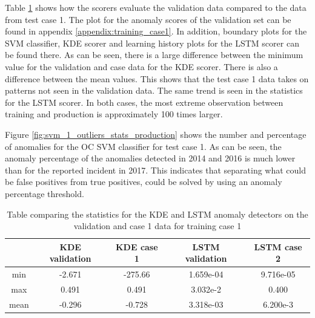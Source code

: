         Table \ref{tab:trainining_plant1_stats} shows how the scorers evaluate the validation data compared to the data from test case 1. The plot for the anomaly scores of the validation set can be found in appendix \ref{appendix:training_case1}. In addition, boundary plots for the SVM classifier, KDE scorer and learning history plots for the LSTM scorer can be found there. As can be seen, there is a large difference between the minimum value for the validation and case data for the KDE scorer. There is also a difference between the mean values. This shows that the test case 1 data takes on patterns not seen in the validation data. The same trend is seen in the statistics for the LSTM scorer. In both cases, the most extreme observation between training and production is approximately 100 times larger.
        
        Figure \ref{fig:svm_1_outliers_stats_production} shows the number and percentage of anomalies for the OC SVM classifier for test case 1. As can be seen, the anomaly percentage of the anomalies detected in 2014 and 2016 is much lower than for the reported incident in 2017. This indicates that separating what could be false positives from true positives, could be solved by using an anomaly percentage threshold. 
        
        \begin{table}[]
            \centering
            \begin{tabular}{ccccc}
                \toprule
                            & \textbf{KDE validation}  & \textbf{KDE case 1}    & \textbf{LSTM validation} & \textbf{LSTM case 2}   \\ \midrule
                min         & -2.671    & -275.66           & 1.659e-04 & 9.716e-05         \\ 
                max         & 0.491     & 0.491             & 3.032e-2  & 0.400             \\ 
                mean        & -0.296    & -0.728            & 3.318e-03 & 6.200e-3          \\ \bottomrule
            \end{tabular}
            \caption{Table comparing the statistics for the KDE and LSTM anomaly detectors on the validation and case 1 data for training case 1}
            \label{tab:trainining_plant1_stats}
        \end{table}
        
